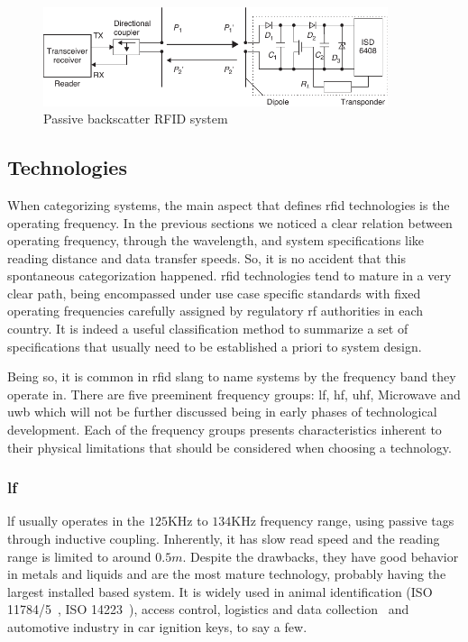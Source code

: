 \begin{figure}[!ht]
    \centering
    \includegraphics[width=0.9\textwidth]{./figs/02-state-of-the-art/backscatter.pdf}
    \caption{Passive backscatter RFID system~\cite{finkenzellerRFIDHandbookFundamentals2003}} 
    \label{fig:backscatter}
\end{figure}

\subsection{Technologies} \label{sec:opfrequency}

When categorizing systems, the main aspect that defines \ac{rfid} technologies is the operating frequency.
In the previous sections we noticed a clear relation between operating frequency, through the wavelength, and system specifications like reading distance and data transfer speeds.
So, it is no accident that this spontaneous categorization happened. \ac{rfid} technologies tend to mature in a very clear path, being encompassed under use case specific standards with fixed operating frequencies carefully assigned by regulatory \ac{rf} authorities in each country. 
It is indeed a useful classification method to summarize a set of specifications that usually need to be established a priori to system design.

Being so, it is common in \ac{rfid} slang to name systems by the frequency band they operate in.
There are five preeminent frequency groups: \ac{lf}, \ac{hf}, \ac{uhf}, Microwave and \ac{uwb} which will not be further discussed being in early phases of technological development.
Each of the frequency groups presents characteristics inherent to their physical limitations that should be considered when choosing a technology.

\subsubsection{\acf{lf}}

\ac{lf} usually operates in the $125$KHz to $134$KHz frequency range, using passive tags through inductive coupling. Inherently, it has slow read speed and the reading range is limited to around $0.5m$. Despite the drawbacks, they have good behavior in metals and liquids and are the most mature technology, probably having the largest installed based system.
It is widely used in animal identification (ISO 11784/5~\cite{isoISO117841996, isoISO117851996}, ISO 14223~\cite{isoISO1422332018}), access control, logistics and data collection~\cite{isoISOIEC180002} and automotive industry in car ignition keys, to say a few.


